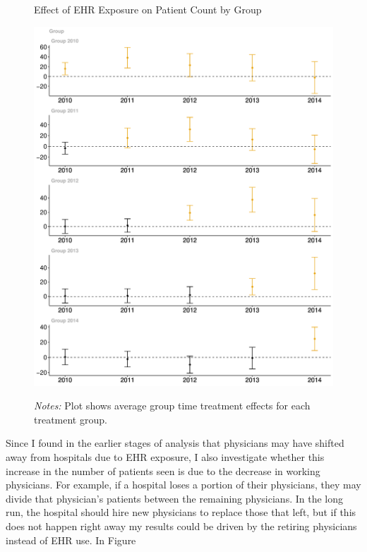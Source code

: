 \documentclass[12pt]{article}
\begin{document}
\begin{figure}[ht!]
    \centering
    \captionsetup{width=.6\linewidth}
    \caption{Effect of EHR Exposure on Patient Count by Group}
    \includegraphics[scale=.47]{Objects/patient_group.pdf}
    \label{fig:patientgroup}
    \vspace{2mm}
    \caption*{\footnotesize{\textit{Notes:} Plot shows average group time treatment effects for each treatment group.}}
\end{figure}

Since I found in the earlier stages of analysis that physicians may have shifted away from hospitals due to EHR exposure, I also investigate whether this increase in the number of patients seen is due to the decrease in working physicians. For example, if a hospital loses a portion of their physicians, they may divide that physician's patients between the remaining physicians. In the long run, the hospital should hire new physicians to replace those that left, but if this does not happen right away my results could be driven by the retiring physicians instead of EHR use. In Figure 
\end{document}

